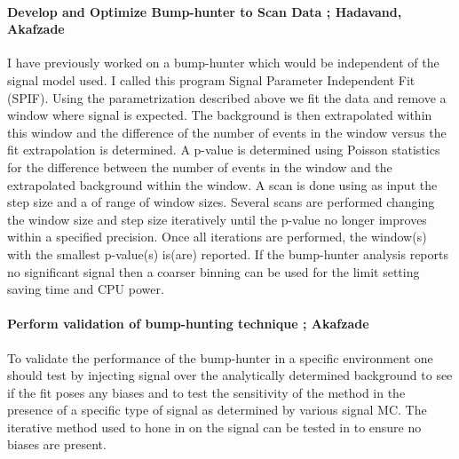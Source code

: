 \documentclass[11pt]{article}
\newcommand{\too}{$\rightarrow$}
\begin{document}
\paragraph{Develop and Optimize Bump-hunter to Scan Data ;  Hadavand, Akafzade} %
I have previously worked on a bump-hunter which would be independent of the signal model used.  I called this program Signal Parameter Independent Fit (SPIF).  Using the parametrization described above we fit the data and remove a window where signal is expected.
The background is then extrapolated within this window and the difference of the number of events in the window versus the fit extrapolation is determined.  A p-value is determined using Poisson statistics for the difference between the number of events in the window and the extrapolated background within the window.
A scan is done using as input the step size and a of range of window sizes.  Several scans are performed changing the window size and step size iteratively until the p-value no longer improves within a specified precision.  
Once all iterations are performed, the window(s) with the smallest p-value(s) is(are) reported.  
If the bump-hunter analysis reports no significant signal then a coarser binning can be used for the limit setting saving time and CPU power.



\paragraph{Perform validation of bump-hunting technique ;  Akafzade} %
To validate the performance of the bump-hunter in a specific environment one should test by injecting signal over the analytically determined background to see if the fit poses any biases and to test the sensitivity of the method in the presence of
a specific type of signal as determined by various signal MC.  The iterative method used to hone in on the signal can be tested in to ensure no biases are present.

\end{document}
